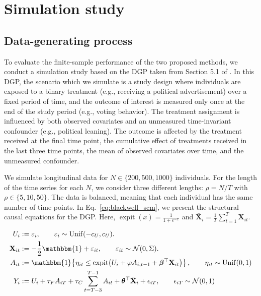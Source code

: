 \chapter{Simulation study}
\label{chap:simulation_study} 
\section{Data-generating process}
To evaluate the finite-sample performance of the two proposed methods, 
we conduct a simulation study based on the DGP taken 
from Section 5.1 of . 
In this 
DGP, the scenario which we simulate is a study design 
where individuals are exposed to a binary treatment
(e.g., receiving a political advertisement) over a fixed period of time, and the outcome of interest
is measured only once at the end of the study period 
(e.g., voting behavior). The treatment assignment
is influenced by both observed covariates and an 
unmeasured time-invariant confounder (e.g., political
leaning). The outcome is affected by the treatment 
received at the final time point, the cumulative 
effect of treatments received in the last three time points, 
the mean of observed covariates over time, 
and the unmeasured confounder. 

We simulate longitudinal data for 
$N \in \{200, 500, 1000\}$ individuals. For the
length of the time series for each $N$, we consider 
three different lengths: $\rho = N/T$ 
with $\rho \in \{5,10,50\}$. The data is balanced,
meaning that each individual has 
the same number of time points. 
In Eq.~\eqref{eq:blackwell_scm}, we present 
the structural causal equations for the DGP. 
Here, $\operatorname{expit}(x) = \frac{1}{1 + e^{-x}}$ and 
$\bar{\mathbf{X}}_{i} = \frac{1}{T}\sum_{t=1}^T \mathbf{X}_{it}$.

\begin{subequations}\label{eq:blackwell_scm}
\begin{align}
U_i &:= \varepsilon_i,
\qquad
\varepsilon_i \sim \operatorname{Unif}(-c_U,c_U).
\\
\mathbf{X}_{it} &:= -\frac{1}{2}\mathbbm{1} + \varepsilon_{it},
\qquad
\varepsilon_{it} \sim \mathcal{N}(0,\Sigma).
\\
A_{it} &:= \mathbbm{1}\!\left\{\eta_{it} \le
\operatorname{expit}\!\left(U_i+\varphi A_{i,t-1}+\boldsymbol{\beta}^\top \mathbf{X}_{it}\right)\right\},
\qquad \eta_{it} \sim \operatorname{Unif}(0,1)
\\
Y_i &:= U_i + \tau_F A_{iT} + \tau_C \sum_{t=T-3}^{T-1} A_{it}
+ \boldsymbol{\theta}^\top \bar{\mathbf{X}}_{i} + \epsilon_{iT},
\qquad \epsilon_{iT} \sim \mathcal{N}(0,1)
\label{eq:blackwell_scm_outcome}
\end{align}
\end{subequations}

